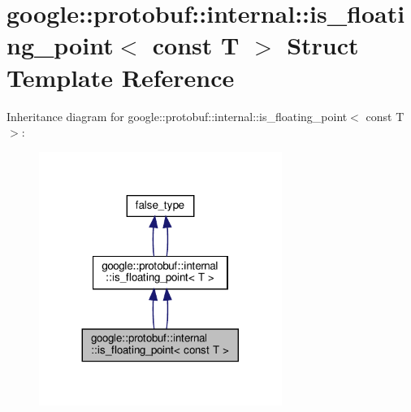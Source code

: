 \hypertarget{structgoogle_1_1protobuf_1_1internal_1_1is__floating__point_3_01const_01T_01_4}{}\section{google\+:\+:protobuf\+:\+:internal\+:\+:is\+\_\+floating\+\_\+point$<$ const T $>$ Struct Template Reference}
\label{structgoogle_1_1protobuf_1_1internal_1_1is__floating__point_3_01const_01T_01_4}


Inheritance diagram for google\+:\+:protobuf\+:\+:internal\+:\+:is\+\_\+floating\+\_\+point$<$ const T $>$\+:
\nopagebreak
\begin{figure}[H]
\begin{center}
\leavevmode
\includegraphics[width=224pt]{structgoogle_1_1protobuf_1_1internal_1_1is__floating__point_3_01const_01T_01_4__inherit__graph}
\end{center}
\end{figure}


